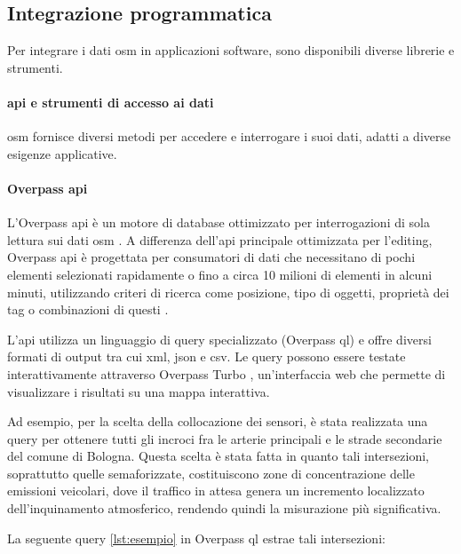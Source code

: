 \subsection{Integrazione programmatica}

Per integrare i dati \acrfull{osm} in applicazioni software, sono disponibili diverse librerie e strumenti.

\paragraph{\acrshort{api} e strumenti di accesso ai dati}

\acrfull{osm} fornisce diversi metodi per accedere e interrogare i suoi dati, adatti a diverse esigenze applicative.

\paragraph{Overpass \acrshort{api}}
L'Overpass \acrshort{api} è un motore di database ottimizzato per interrogazioni di sola lettura sui dati \acrshort{osm}
\cite{overpass2024}. A differenza dell'\acrshort{api} principale ottimizzata per l'editing, Overpass \acrshort{api}
è progettata per consumatori di dati che necessitano di pochi elementi selezionati rapidamente o
fino a circa 10 milioni di elementi in alcuni minuti, utilizzando criteri di ricerca come posizione,
tipo di oggetti, proprietà dei tag o combinazioni di questi \cite{overpass2024}.

L'\acrshort{api} utilizza un linguaggio di query specializzato (Overpass \acrshort{ql}) e
offre diversi formati di output tra cui \acrshort{xml}, \acrshort{json} e \acrshort{csv}.
Le query possono essere testate interattivamente attraverso Overpass Turbo \cite{overpassturbo2024},
un'interfaccia web che permette di visualizzare i risultati su una mappa interattiva.

Ad esempio, per la scelta della collocazione dei sensori, è stata realizzata una query per ottenere tutti gli incroci
fra le arterie principali e le strade secondarie del comune di Bologna. Questa scelta è stata fatta in quanto tali
intersezioni, soprattutto quelle semaforizzate, costituiscono zone di concentrazione delle emissioni veicolari,
dove il traffico in attesa genera un incremento localizzato dell'inquinamento atmosferico,
rendendo quindi la misurazione più significativa.

La seguente query \ref{lst:esempio} in Overpass \acrshort{ql} estrae tali intersezioni:

